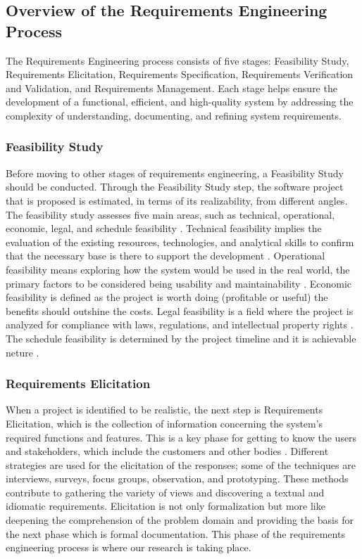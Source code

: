 \documentclass[conference]{IEEEtran}
\begin{document}
\subsection{Overview of the Requirements Engineering Process}

The Requirements Engineering process consists of five stages: Feasibility Study, Requirements Elicitation, Requirements Specification, Requirements Verification and Validation, and Requirements Management. Each stage helps ensure the development of a functional, efficient, and high-quality system by addressing the complexity of understanding, documenting, and refining system requirements.

\subsubsection{Feasibility Study}

Before moving to other stages of requirements engineering, a Feasibility Study should be conducted. Through the Feasibility Study step, the software project that is proposed is estimated, in terms of its realizability, from different angles. The feasibility study assesses five main areas, such as technical, operational, economic, legal, and schedule feasibility \cite{cite2}. Technical feasibility implies the evaluation of the existing resources, technologies, and analytical skills to confirm that the necessary base is there to support the development \cite{cite3}. Operational feasibility means exploring how the system would be used in the real world, the primary factors to be considered being usability and maintainability \cite{cite3}. Economic feasibility is defined as the project is worth doing (profitable or useful) the benefits should outshine the costs. Legal feasibility is a field where the project is analyzed for compliance with laws, regulations, and intellectual property rights  \cite{cite3}. The schedule feasibility is determined by the project timeline and it is achievable neture  \cite{cite3}.

\subsubsection{Requirements Elicitation}

When a project is identified to be realistic, the next step is Requirements Elicitation, which is the collection of information concerning the system’s required functions and features. This is a key phase for getting to know the users and stakeholders, which include the customers and other bodies  \cite{cite2}. Different strategies are used for the elicitation of the responses; some of the techniques are interviews, surveys, focus groups, observation, and prototyping. These methods contribute to gathering the variety of views and discovering a textual and idiomatic requirements. Elicitation is not only formalization but more like deepening the comprehension of the problem domain and providing the basis for the next phase which is formal documentation. This phase of the requirements engineering process is where our research is taking place.
\end{document}
